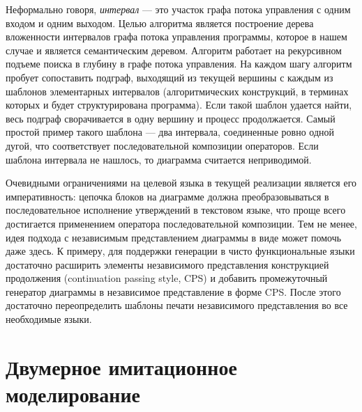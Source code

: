 \documentclass[a5paper]{article}
\begin{document}
Неформально говоря, \textit{интервал} --- это участок графа потока управления с одним входом и одним выходом. Целью алгоритма является построение дерева вложенности интервалов графа потока управления программы, которое в нашем случае и является семантическим деревом. Алгоритм работает на рекурсивном подъеме поиска в глубину в графе потока управления. На каждом шагу алгоритм пробует сопоставить подграф, выходящий из текущей вершины с каждым из шаблонов элементарных интервалов (алгоритмических конструкций, в терминах которых и будет структурирована программа). Если такой шаблон удается найти, весь подграф сворачивается в одну вершину и процесс продолжается. Самый простой пример такого шаблона --- два интервала, соединенные ровно одной дугой, что соответствует последовательной композиции операторов. Если шаблона интервала не нашлось, то диаграмма считается неприводимой.

Очевидными ограничениями на целевой языка в текущей реализации является его императивность: цепочка блоков на диаграмме должна преобразовываться в последовательное исполнение утверждений в текстовом языке, что проще всего достигается применением оператора последовательной композиции. Тем не менее,  идея подхода с независимым представлением диаграммы в виде может помочь даже здесь. К примеру, для поддержки генерации в чисто функциональные языки достаточно расширить элементы независимого представления конструкцией продолжения (continuation passing style, CPS) и добавить промежуточный генератор диаграммы в независимое представление в форме CPS. После этого достаточно переопределить шаблоны печати независимого представления во все необходимые языки.

\section{Двумерное имитационное моделирование}
\label{chapter:2dModel}
\end{document}
